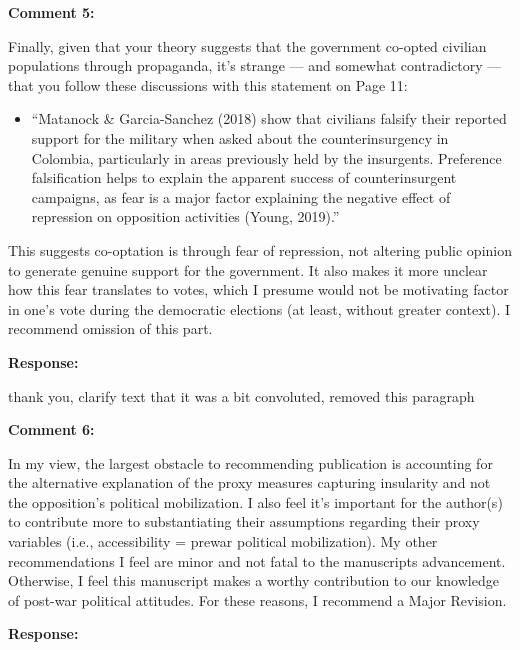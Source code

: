 \documentclass[12pt, a4paper, notitlepage]{article}
\begin{document}
\vspace{15pt}
\noindent\textbf{Comment 5:}
\begin{displayquote}
Finally, given that your theory suggests that the government co-opted civilian populations through propaganda, it’s strange — and somewhat contradictory — that you follow these discussions with this statement on Page 11:
\begin{itemize}
  \item[] ``Matanock & Garcia-Sanchez (2018) show that civilians falsify their reported support for the military when asked about the counterinsurgency in Colombia, particularly in areas previously held by the insurgents. Preference falsification helps to explain the apparent success of counterinsurgent campaigns, as fear is a major factor explaining the negative effect of repression on opposition activities (Young, 2019).''
\end{itemize}
This suggests co-optation is through fear of repression, not altering public opinion to generate genuine support for the government. It also makes it more unclear how this fear translates to votes, which I presume would not be motivating factor in one’s vote during the democratic elections (at least, without greater context). I recommend omission of this part.
\end{displayquote}

\noindent\textbf{Response:} {}

thank you, clarify text that it was a bit convoluted, removed this paragraph

\vspace{15pt}
\noindent\textbf{Comment 6:}
\begin{displayquote}
In my view, the largest obstacle to recommending publication is accounting for the alternative explanation of the proxy measures capturing insularity and not the opposition’s political mobilization. I also feel it’s important for the author(s) to contribute more to substantiating their assumptions regarding their proxy variables (i.e., accessibility = prewar political mobilization). My other recommendations I feel are minor and not fatal to the manuscripts advancement. Otherwise, I feel this manuscript makes a worthy contribution to our knowledge of post-war political attitudes. For these reasons, I recommend a Major Revision.
\end{displayquote}

\noindent\textbf{Response:} {}
\end{document}
